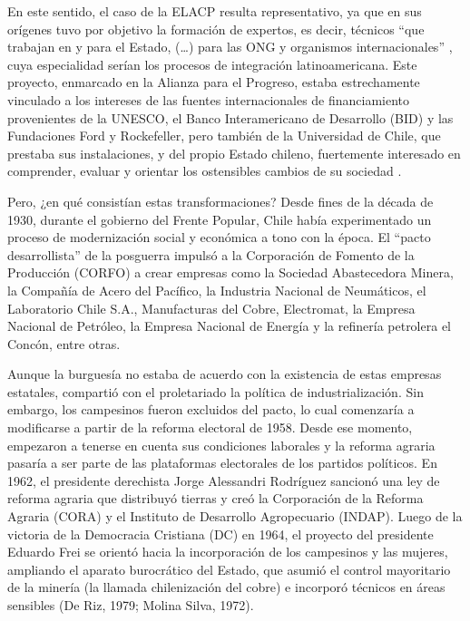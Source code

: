 En este sentido, el caso de la ELACP resulta representativo, ya que en sus orígenes tuvo por objetivo la formación de expertos, es decir, técnicos \enquote{que trabajan en y para el Estado, (\dots) para las ONG y organismos internacionales} \parencite[15]{1549-NEIBURG2004}, cuya especialidad serían los procesos de integración latinoamericana. Este proyecto, enmarcado en la Alianza para el Progreso, estaba estrechamente vinculado a los intereses de las fuentes internacionales de financiamiento provenientes de la UNESCO, el Banco Interamericano de Desarrollo (BID) y las Fundaciones Ford y Rockefeller, pero también de la Universidad de Chile, que prestaba sus instalaciones, y del propio Estado chileno, fuertemente interesado en comprender, evaluar y orientar los ostensibles cambios de su sociedad \parencite{1514-ABARZUACUTRONI2010,1524-BEIGEL2010,1529-QUESADA2010}.

Pero, ¿en qué consistían estas transformaciones? Desde fines de la década de 1930, durante el gobierno del Frente Popular, Chile había experimentado un proceso de modernización social y económica a tono con la época. El \enquote{pacto desarrollista} de la posguerra impulsó a la Corporación de Fomento de la Producción (CORFO) a crear empresas como la Sociedad Abastecedora Minera, la Compañía de Acero del Pacífico, la Industria Nacional de Neumáticos, el Laboratorio Chile S.A., Manufacturas del Cobre, Electromat, la Empresa Nacional de Petróleo, la Empresa Nacional de Energía y la refinería petrolera el Concón, entre otras.

Aunque la burguesía no estaba de acuerdo con la existencia de estas empresas estatales, compartió con el proletariado la política de industrialización. Sin embargo, los campesinos fueron excluidos del pacto, lo cual comenzaría a modificarse a partir de la reforma electoral de 1958. Desde ese momento, empezaron a tenerse en cuenta sus condiciones laborales y la reforma agraria pasaría a ser parte de las plataformas electorales de los partidos políticos. En 1962, el presidente derechista Jorge Alessandri Rodríguez sancionó una ley de reforma agraria que distribuyó tierras y creó la Corporación de la Reforma Agraria (CORA) y el Instituto de Desarrollo Agropecuario (INDAP). Luego de la victoria de la Democracia Cristiana (DC) en 1964, el proyecto del presidente Eduardo Frei se orientó hacia la incorporación de los campesinos y las mujeres, ampliando el aparato burocrático del Estado, que asumió el control mayoritario de la minería (la llamada chilenización del cobre) e incorporó técnicos en áreas sensibles \parencite{1517-ALWIN1986}(De Riz, 1979; Molina Silva, 1972).

